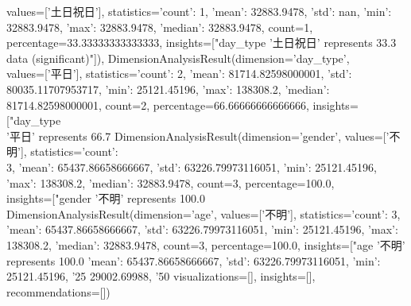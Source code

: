 \documentclass[11pt,a4paper]{article}
\begin{document}
\begin{itemize}
values=['土日祝日'], statistics={'count': 1, 'mean': 32883.9478, 'std': nan, 'min':\\
32883.9478, 'max': 32883.9478, 'median': 32883.9478}, count=1,\\
percentage=33.33333333333333, insights=["day\_type '土日祝日' represents 33.3%
data (significant)"]), DimensionAnalysisResult(dimension='day\_type',\\
values=['平日'], statistics={'count': 2, 'mean': 81714.82598000001, 'std':\\
80035.11707953717, 'min': 25121.45196, 'max': 138308.2, 'median':\\
81714.82598000001}, count=2, percentage=66.66666666666666, insights=["day\_type\\
'平日' represents 66.7%
DimensionAnalysisResult(dimension='gender', values=['不明'], statistics={'count':\\
3, 'mean': 65437.86658666667, 'std': 63226.79973116051, 'min': 25121.45196,\\
'max': 138308.2, 'median': 32883.9478}, count=3, percentage=100.0,\\
insights=["gender '不明' represents 100.0%
DimensionAnalysisResult(dimension='age', values=['不明'], statistics={'count': 3,\\
'mean': 65437.86658666667, 'std': 63226.79973116051, 'min': 25121.45196, 'max':\\
138308.2, 'median': 32883.9478}, count=3, percentage=100.0, insights=["age '不明'\\
represents 100.0%
'mean': 65437.86658666667, 'std': 63226.79973116051, 'min': 25121.45196, '25%
29002.69988, '50%
visualizations=[], insights=[], recommendations=[])
\end{itemize}
\end{document}
